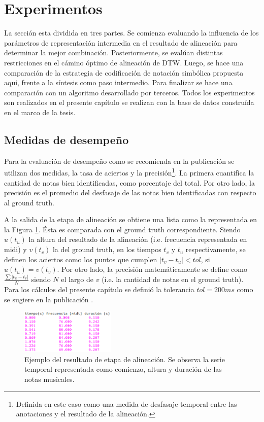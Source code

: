 \documentclass
  [ams,pdfout]%
	{aeslac}
\begin{document}
\section{Experimentos}

La sección esta dividida en tres partes. Se comienza evaluando la influencia de los parámetros de representación intermedia en el resultado de alineación para determinar la mejor combinación. Posteriormente, se evalúan distintas restricciones en el cámino óptimo de alineación de DTW. Luego, se hace una comparación de la estrategia de codificación de notación simbólica propuesta aquí, frente a la síntesis como paso intermedio. Para finalizar se hace una comparación con un algoritmo desarrollado por terceros. Todos los experimentos son realizados en el presente capítulo se realizan con la base de datos construída en el marco de la tesis. 

\subsection{Medidas de desempeño}
\label{sec:medidas_desempeno}

Para la evaluación de desempeño como se recomienda en la publicación \cite{orio2003score} se utilizan dos medidas, la tasa de aciertos y la precisión\footnote{Definida en este caso como una medida de desfasaje temporal entre las anotaciones y el resultado de la alineación.}. La primera cuantifíca la cantidad de notas bien identificadas, como porcentaje del total. Por otro lado, la precisión es el promedio del desfasaje de las notas bien identificadas con respecto al ground truth.

A la salida de la etapa de alineación se obtiene una lista como la representada en la Figura \ref{fig:datos_tabla}. Ésta es comparada con el ground truth correspondiente. Siendo $u(t_u)$ la altura del resultado de la alineación (i.e. frecuencia representada en midi) y $v(t_v)$ la del ground truth, en los tiempos $t_v$ y $t_u$ respectivamente, se definen los aciertos como los puntos que cumplen $|t_v-t_u|<tol$, si $u(t_u)=v(t_v)$. Por otro lado, la precisión matemáticamente se define como $\frac{\sum{|t_u-t_v|}}{N}$ siendo $N$ el largo de $v$ (i.e. la cantidad de notas en el ground truth). Para los cálculos del presente capítulo se definió la tolerancia $tol=200ms$ como se sugiere en la publicación \cite{orio2001alignment}.

\begin{figure}[h!]
\begin{center}
\includegraphics[width=0.4\textwidth]{imagenes/datos} 	
\caption{Ejemplo del resultado de etapa de alineación. Se observa la serie temporal representada como comienzo, altura y duración de las notas musicales.}
\label{fig:datos_tabla}
\end{center}
\end{figure}
\end{document}
